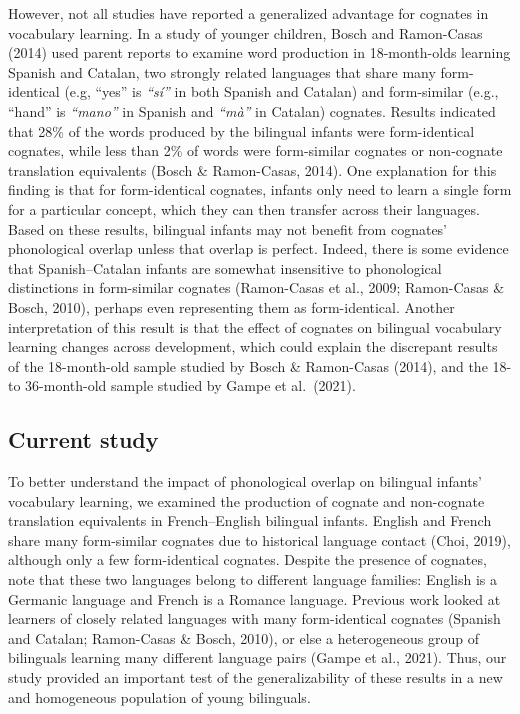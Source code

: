 \documentclass[
  english,
  ,man,floatsintext]{apa6}
\begin{document}
However, not all studies have reported a generalized advantage for cognates in vocabulary learning. In a study of younger children, Bosch and Ramon-Casas (2014) used parent reports to examine word production in 18-month-olds learning Spanish and Catalan, two strongly related languages that share many form-identical (e.g, ``yes'' is \emph{``sí''}  in both Spanish and Catalan) and form-similar (e.g., ``hand'' is \emph{``mano''}  in Spanish and \emph{``mà''}  in Catalan) cognates. Results indicated that 28\% of the words produced by the bilingual infants were form-identical cognates, while less than 2\% of words were form-similar cognates or non-cognate translation equivalents (Bosch \& Ramon-Casas, 2014). One explanation for this finding is that for form-identical cognates, infants only need to learn a single form for a particular concept, which they can then transfer across their languages. Based on these results, bilingual infants may not benefit from cognates' phonological overlap unless that overlap is perfect. Indeed, there is some evidence that Spanish--Catalan infants are somewhat insensitive to phonological distinctions in form-similar cognates (Ramon-Casas et al., 2009; Ramon-Casas \& Bosch, 2010), perhaps even representing them as form-identical. Another interpretation of this result is that the effect of cognates on bilingual vocabulary learning changes across development, which could explain the discrepant results of the 18-month-old sample studied by Bosch \& Ramon-Casas (2014), and the 18- to 36-month-old sample studied by Gampe et al.~(2021).

\hypertarget{current-study}{%
\subsection{Current study}\label{current-study}}

To better understand the impact of phonological overlap on bilingual infants' vocabulary learning, we examined the production of cognate and non-cognate translation equivalents in French--English bilingual infants. English and French share many form-similar cognates due to historical language contact (Choi, 2019), although only a few form-identical cognates. Despite the presence of cognates, note that these two languages belong to different language families: English is a Germanic language and French is a Romance language. Previous work looked at learners of closely related languages with many form-identical cognates (Spanish and Catalan; Ramon-Casas \& Bosch, 2010), or else a heterogeneous group of bilinguals learning many different language pairs (Gampe et al., 2021). Thus, our study provided an important test of the generalizability of these results in a new and homogeneous population of young bilinguals.
\end{document}
